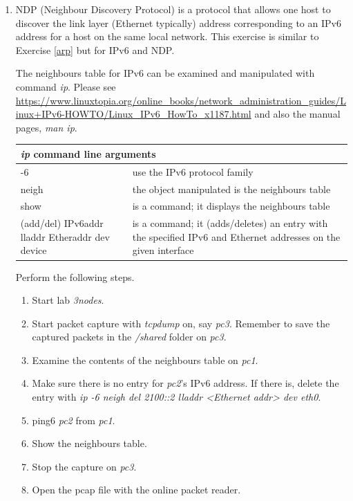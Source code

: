 \documentclass[12pt]{book}
\begin{document}
\begin{enumerate}
\item NDP (Neighbour Discovery Protocol) is a protocol that allows one host to discover the link layer (Ethernet typically) address corresponding to an IPv6 address for a host on the same local network. This exercise is similar to Exercise \ref{arp} but for IPv6 and NDP.

The neighbours table for IPv6 can be examined and manipulated with command \emph{ip}. Please see \url{https://www.linuxtopia.org/online_books/network_administration_guides/Linux+IPv6-HOWTO/Linux_IPv6_HowTo_x1187.html} and also the manual pages, \emph{man ip}.

\smallskip
\begin{tabularx}{0.9\textwidth}{p{5cm} X} \toprule
  \multicolumn{2}{l}{\emph{ip} command line arguments} \\ \midrule
  -6 & use the IPv6 protocol family \\
  neigh & the object manipulated is the neighbours table \\
  show & is a command; it displays the neighbours table \\
  (add/del) IPv6addr lladdr Etheraddr dev device & is a command; it  (adds/deletes) an entry with the specified IPv6 and Ethernet addresses on the given interface\\ \bottomrule
  \end{tabularx}
\smallskip

  Perform the following steps.
  \begin{enumerate}[label=(\roman*)]
  \item Start lab \emph{3nodes}.
  \item Start packet capture with \emph{tcpdump} on, say \emph{pc3}. Remember to save the captured packets in the \emph{/shared} folder on \emph{pc3}.
  \item Examine the contents of the neighbours table on \emph{pc1}.
  \item Make sure there is no entry for \emph{pc2}'s IPv6 address. If there is, delete the entry with \emph{ip -6 neigh del 2100::2 lladdr <Ethernet addr> dev eth0}.
  \item ping6 \emph{pc2} from \emph{pc1}.
  \item Show the neighbours table.
  \item Stop the capture on \emph{pc3}.
    \item Open the pcap file with the online packet reader. 
  \end{enumerate}


\end{enumerate}
\end{document}
